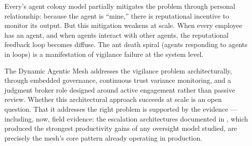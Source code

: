 Every's agent colony model partially mitigates the problem through personal relationship: because the agent is ``mine,'' there is reputational incentive to monitor its output. But this mitigation weakens at scale. When every employee has an agent, and when agents interact with other agents, the reputational feedback loop becomes diffuse. The ant death spiral (agents responding to agents in loops) is a manifestation of vigilance failure at the system level.

The Dynamic Agentic Mesh addresses the vigilance problem architecturally, through embedded governance, continuous trust variance monitoring, and a judgment broker role designed around active engagement rather than passive review. Whether this architectural approach succeeds at scale is an open question. That it addresses the right problem is supported by the evidence --- including, now, field evidence: the escalation architectures documented in \textcite{Pereira2026Playbook}, which produced the strongest productivity gains of any oversight model studied, are precisely the mesh's core pattern already operating in production.
